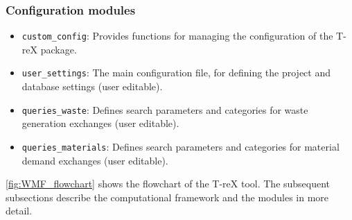 \subsubsection{Configuration modules}
\begin{itemize}
    \item \texttt{custom\_config}: Provides functions for managing the configuration of the T-reX package.
    \item \texttt{user\_settings}: The main configuration file, for defining the project and database settings (user editable).
    \item \texttt{queries\_waste}: Defines search parameters and categories for waste generation exchanges (user editable).
    \item \texttt{queries\_materials}: Defines search parameters and categories for material demand exchanges (user editable).
\end{itemize}

\autoref{fig:WMF_flowchart} shows the flowchart of the T-reX tool. The subsequent subsections describe the computational framework and the modules in more detail.


